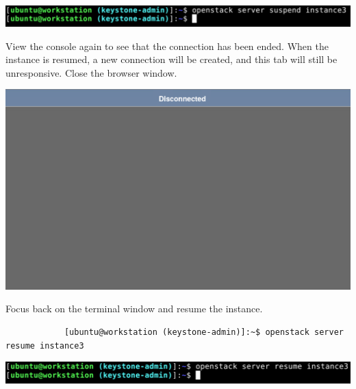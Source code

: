 \documentclass[letterpaper, 12pt]{article}
\begin{document}
\begin{enumerate}
\begin{labstep}
        \begin{center}
            \includegraphics[width=\linewidth]{images/part4/step10.png}
        \end{center}
    \end{labstep}

    \begin{labstep}
        View the console again to see that the connection has been ended.
        When the instance is resumed, a new connection will be created, and this tab will still be unresponsive.
        Close the browser window.

        \begin{center}
            \includegraphics[width=\linewidth]{images/part4/step11.png}
        \end{center}
    \end{labstep}

    \begin{labstep}
        Focus back on the terminal window and resume the instance.
        \begin{lstlisting}
            [ubuntu@workstation (keystone-admin)]:~$ openstack server resume instance3
        \end{lstlisting}

        \begin{center}
            \includegraphics[width=\linewidth]{images/part4/step12.png}
        \end{center}
    \end{labstep}


\end{enumerate}
\end{document}
